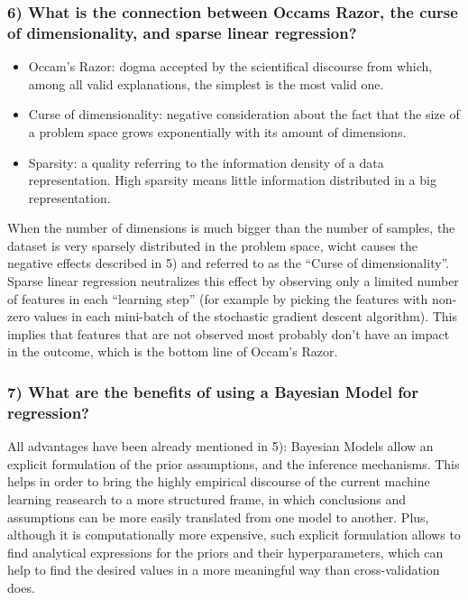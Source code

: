 \documentclass[11pt]{scrartcl} %
\begin{document}
         \subsubsection*{6) What is the connection between Occams Razor, the curse of dimensionality, and sparse linear regression?}
         \begin{itemize}
         \item Occam's Razor: dogma accepted by the scientifical discourse from which, among all valid explanations, the simplest is the most valid one.
         \item Curse of dimensionality: negative consideration about the fact that the size of a problem space grows exponentially with its amount of dimensions.
         \item Sparsity: a quality referring to the information density of a data representation. High sparsity means little information distributed in a big representation.
         \end{itemize}
         When the number of dimensions is much bigger than the number of samples, the dataset is very sparsely distributed in the problem space, wicht causes the negative effects described in 5) and referred to as the ``Curse of dimensionality''. Sparse linear regression neutralizes this effect by observing only a limited number of features in each ``learning step'' (for example by picking the features with non-zero values in each mini-batch of the stochastic gradient descent algorithm). This implies that features that are not observed most probably don't have an impact in the outcome, which is the bottom line of Occam's Razor.

         \subsubsection*{7) What are the benefits of using a Bayesian Model for regression?}
         All advantages have been already mentioned in 5): Bayesian Models allow an explicit formulation of the prior assumptions, and the inference mechanisms. This helps in order to bring the highly empirical discourse of the current machine learning reasearch to a more structured frame, in which conclusions and assumptions can be more easily translated from one model to another. Plus, although it is computationally more expensive, such explicit formulation allows to find analytical expressions for the priors and their hyperparameters, which can help to find the desired values in a more meaningful way than cross-validation does.
\end{document}
